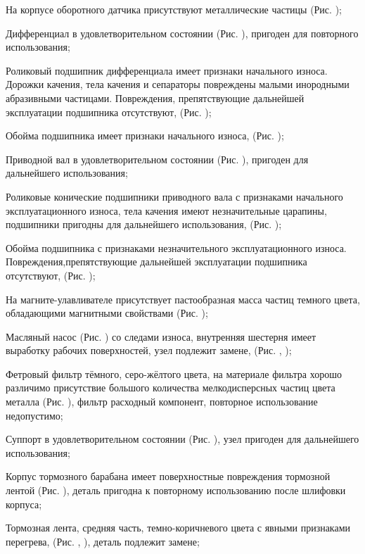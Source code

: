 На корпусе оборотного датчика присутствуют  металлические  частицы (Рис. );

Дифференциал в удовлетворительном состоянии (Рис. ), пригоден для повторного использования;

Роликовый подшипник дифференциала имеет признаки начального износа. Дорожки качения, тела качения и сепараторы повреждены малыми инородными абразивными частицами. Повреждения, препятствующие дальнейшей эксплуатации подшипника отсутствуют, (Рис. );

Обойма подшипника имеет признаки начального износа,  (Рис. );

Приводной вал в удовлетворительном состоянии (Рис. ), пригоден для дальнейшего использования;

Роликовые конические подшипники приводного вала с признаками начального эксплуатационного износа, тела качения имеют незначительные царапины,  подшипники пригодны для дальнейшего использования, (Рис. );

Обойма подшипника с признаками незначительного эксплуатационного износа. Повреждения,препятствующие дальнейшей эксплуатации подшипника отсутствуют,   (Рис. );

На магните-улавливателе  присутствует пастообразная масса частиц  темного цвета, обладающими магнитными свойствами (Рис. );

Масляный насос (Рис. ) со следами износа, внутренняя шестерня имеет  выработку рабочих поверхностей,  узел подлежит замене,  (Рис. , );

Фетровый фильтр тёмного, серо-жёлтого цвета, на материале фильтра  хорошо различимо присутствие большого количества мелкодисперсных частиц цвета металла  (Рис. ), фильтр расходный компонент, повторное использование недопустимо;

Суппорт в удовлетворительном состоянии (Рис. ), узел пригоден для дальнейшего использования;

Корпус тормозного барабана имеет поверхностные повреждения  тормозной лентой (Рис. ), деталь пригодна к повторному использованию после шлифовки корпуса;

Тормозная лента, средняя часть, темно-коричневого цвета с явными признаками перегрева, (Рис. , ), деталь подлежит замене; 

